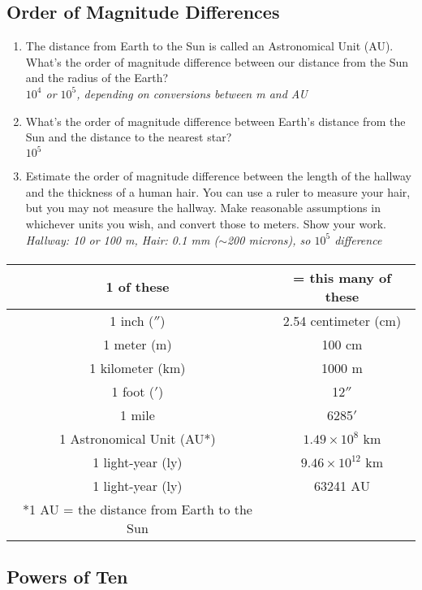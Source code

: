 \documentclass[12pt]{article}%
\begin{document}
\begin{flushleft}
\subsection{Order of Magnitude Differences}

\begin{enumerate}
\item The distance from Earth to the Sun is called an Astronomical Unit (AU).  What's the order of magnitude difference between our distance from the Sun and the radius of the Earth? \\ {\it $10^4$ or $10^5$, depending on conversions between m and AU}
\item What's the order of magnitude difference between Earth's distance from the Sun and the distance to the nearest star? \\ {\it $10^5$}
\item Estimate the order of magnitude difference between the length of the hallway and the thickness of a human hair. You can use a ruler to measure your hair, but you may not measure the hallway. Make reasonable assumptions in whichever units you wish, and convert those to meters.  Show your work.\\ {\it Hallway: 10 or 100 m, Hair: 0.1 mm ($\sim$200 microns), so $10^5$ difference}
\end{enumerate}

\paragraph{}
\begin{tabular}{cc}
\hline
\hline
{\bf1 of these} & {\bf= this many of these} \\
\hline
1 inch ($''$) & 2.54 centimeter (cm) \\
1 meter (m) & 100 cm \\
1 kilometer (km) & 1000 m \\
1 foot ($'$) & 12$''$ \\
1 mile & 6285$'$ \\
1 Astronomical Unit (AU*) & $1.49\times10^8$ km \\
1 light-year (ly) & $9.46\times10^{12}$ km \\
1 light-year (ly) & 63241 AU \\
\hline
\hline
*1 AU = the distance from Earth to the Sun
\end{tabular}

\subsection{Powers of Ten}

\end{flushleft}
\end{document}
